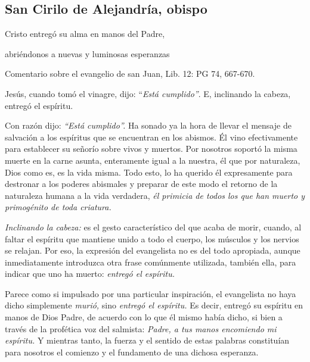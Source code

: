 			\subsection{San Cirilo de Alejandría, obispo}
			
			\begin{patertheme}Cristo entregó su alma en manos del Padre, \end{patertheme}
			
			\begin{patertheme}abriéndonos a nuevas y luminosas esperanzas\end{patertheme}
			
			\begin{patersource}Comentario sobre el evangelio de san Juan, Lib. 12: PG 74, 667-670.\end{patersource}
			
			\begin{body}Jesús, cuando tomó el vinagre, dijo: “\textit{Está cumplido”}. E, inclinando la cabeza, entregó el espíritu.\end{body}
			
			\begin{body}Con razón dijo: \textit{“Está cumplido”. }Ha sonado ya la hora de llevar el mensaje de salvación a los espíritus que se encuentran en los abismos. Él vino efectivamente para establecer su señorío sobre vivos y muertos. Por nosotros soportó la misma muerte en la carne asunta, enteramente igual a la nuestra, él que por naturaleza, Dios como es, es la vida misma. Todo esto, lo ha querido él expresamente para destronar a los poderes abismales y preparar de este modo el retorno de la naturaleza humana a la vida verdadera, \textit{él primicia de todos los que han muerto y primogénito de toda criatura.}\end{body}
			
			\begin{body}\textit{Inclinando la cabeza: }es el gesto característico del que acaba de morir, cuando, al faltar el espíritu que mantiene unido a todo el cuerpo, los músculos y los nervios se relajan. Por eso, la expresión del evangelista no es del todo apropiada, aunque inmediatamente introduzca otra frase comúnmente utilizada, también ella, para indicar que uno ha muerto: \textit{entregó el espíritu.}\end{body}
			
			\begin{body}Parece como si impulsado por una particular inspiración, el evangelista no haya dicho simplemente \textit{murió, }sino \textit{entregó el espíritu. }Es decir, entregó su espíritu en manos de Dios Padre, de acuerdo con lo que él mismo había dicho, si bien a través de la profética voz del salmista: \textit{Padre, a tus manos encomiendo mi espíritu. }Y mientras tanto, la fuerza y el sentido de estas palabras constituían para nosotros el comienzo y el fundamento de una dichosa esperanza.\end{body}
			
